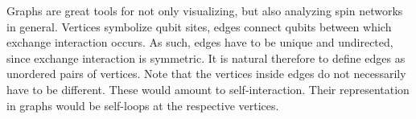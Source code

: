 
\begin{center}
\end{center}

\noindent Graphs are great tools for not only visualizing, but also analyzing spin networks in general. Vertices symbolize qubit sites, edges connect qubits between which exchange interaction occurs. As such, edges have to be unique and undirected, since exchange interaction is symmetric. It is natural therefore to define edges as unordered pairs of vertices. Note that the vertices inside edges do not necessarily have to be different. These would amount to self-interaction. Their representation in graphs would be self-loops at the respective vertices.

